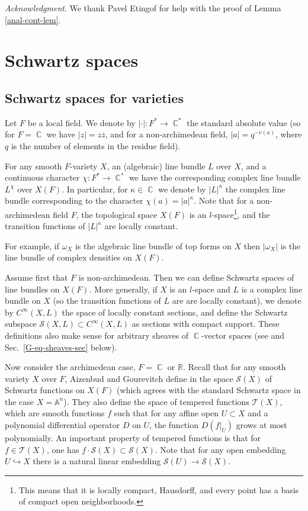 \documentclass[12pt,reqno]{amsart}
\DeclareMathOperator\C{\mathbb C}
\theoremstyle{definition}
\theoremstyle{remark}
\numberwithin{equation}{section}
\newcommand{\hra}{\hookrightarrow}
\newcommand{\A}{{\mathbb A}}
\newcommand{\TT}{{\mathcal T}}
\renewcommand{\SS}{{\mathcal S}}
\newcommand{\sub}{\subset}
\newcommand{\ov}{\overline}
\newcommand{\om}{\omega}
\newcommand{\R}{{\mathbb R}}
\begin{document}
\medskip

{\it Acknowledgment}. We thank Pavel Etingof for help with the proof of Lemma \ref{anal-cont-lem}.

\section{Schwartz spaces}\label{Schw-sec}

\subsection{Schwartz spaces for varieties}\label{Schwartz-var-sec}

Let $F$ be a local field. We denote by $|\cdot |:F^*\to \C^*$ the standard absolute value (so for $F=\C$ we have $|z|=z\ov{z}$, and for a non-archimedean field,
$|a|=q^{-v(a)}$, where $q$ is the number of elements in the residue field).

For any smooth $F$-variety $X$, an (algebraic) line bundle $L$ over $X$, and a continuous character $\chi:F^*\to \C^*$ we have the corresponding
complex line bundle $L^{\chi}$ over $X(F)$. In particular, for  $\kappa\in \C$ we denote  by $|L|^{\kappa}$ the complex line bundle corresponding
to the character $\chi(a)=|a|^{\kappa}$. Note that for a non-archimedean field $F$,
the topological space $X(F)$ is an $l$-space\footnote{This means that it is locally compact, Hausdorff, and every point has a basis of compact open
neighborhoods.}, and the transition functions of $|L|^{\kappa}$ are locally constant.

For example, if $\om_X$ is the algebraic line bundle of top forms on $X$ then $|\om_X|$ is the line bundle of complex densities on $X(F)$.

Assume first that $F$ is non-archimedean. Then we can define Schwartz spaces of line bundles on $X(F)$. More generally, 
if $X$ is an $l$-space and $L$ is a complex line bundle on $X$
(so the transition functions of $L$ are are locally constant), we denote by $C^\infty(X,L)$ the space of locally constant sections,
and define the Schwartz subspace $\SS(X,L)\sub C^\infty(X,L)$ as sections  
with compact support. These definitions also make sense for arbitrary sheaves of $\C$-vector spaces (see \cite[Sec.\ 1.3]{Bern} and Sec.\ \ref{G-eq-sheaves-sec} below).

Now consider the archimedean case, $F=\C$ or $\R$.
Recall that for any smooth variety $X$ over $F$, Aizenbud and Gourevitch define in \cite{AG} the space $\SS(X)$ of Schwartz functions on $X(F)$
(which agrees with the standard Schwartz space in the case $X=\A^n$).
They also define the  space of tempered functions $\TT(X)$, which are smooth functions $f$ such that for any affine open $U\sub X$ and a polynomial differential
operator $D$ on $U$, the function $D(f|_U)$ grows at most polynomially. An important property of tempered functions is that
for $f\in \TT(X)$, one has $f\cdot \SS(X)\sub \SS(X)$.
Note that for any open embedding $U\hra X$ there is a natural linear embedding $\SS(U)\to \SS(X)$.
\end{document}
